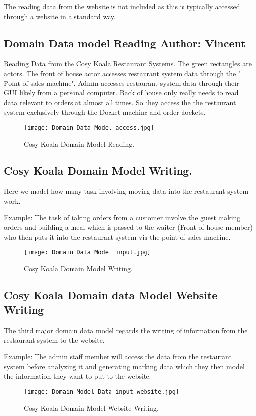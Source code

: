 \documentclass{article}
\begin{document}
The reading data from the website is not included as this is typically accessed through a website in a standard way.

\clearpage
\subsection{ Domain Data model Reading \normalsize\textbf{Author: Vincent}}
Reading Data from the Cosy Koala Restaurant Systems. The green rectangles are actors.
The front of house actor accesses restaurant system data through the " Point of sales machine".
Admin accesses restaurant system data through their GUI likely from a personal computer.
Back of house only really needs to read data relevant to orders at almost all times. So they access the the restaurant system exclusively through the Docket machine and order dockets.





\begin{figure}[!ht]
    \centering
    \texttt{[image: Domain Data Model access.jpg]}
    \caption{Cosy Koala Domain Model Reading.}
    \label{fig:Domain_Model_access}
\end{figure}

\clearpage
\subsection{Cosy Koala Domain Model Writing.}
Here we model how many task involving moving data into the restaurant system work.

Example: The task of taking orders from a customer involve the guest making orders and building a meal which is passed to the waiter (Front of house member) who then puts it into the restaurant system via the point of sales machine.
\begin{figure}[!ht]
    \centering
    \texttt{[image: Domain Data Model input.jpg]}
    \caption{Cosy Koala Domain Model Writing.}
    \label{fig:Domain_Model_input}
\end{figure}

\clearpage
\subsection{Cosy Koala Domain data Model Website Writing}
The third major domain data model regards the writing of information from the restaurant system to the website.

Example: The admin staff member will access the data from the restaurant system before analyzing it and generating marking data which they then model the information they want to put to the website.
\begin{figure}[!ht]
    \centering
    \texttt{[image: Domain Model Data input website.jpg]}
    \caption{Cosy Koala Domain Model Website Writing.}
    \label{fig:Domain_Model_website}
\end{figure}
\end{document}
